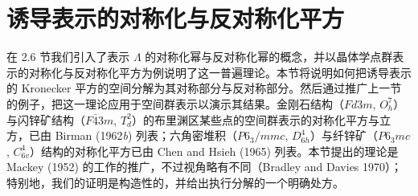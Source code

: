 \section{诱导表示的对称化与反对称化平方}

在 2.6 节我们引入了表示 $\Lambda$ 的对称化幂与反对称化幂的概念，并以晶体学点群表示的对称化与反对称化平方为例说明了这一普遍理论。本节将说明如何把诱导表示的 Kronecker 平方的空间分解为其对称部分与反对称部分。然后通过推广上一节的例子，把这一理论应用于空间群表示以演示其结果。金刚石结构（$Fd3m$, $O^{7}_{h}$）与闪锌矿结构（$F\bar{4}3m$, $T^{2}_{d}$）的布里渊区某些点的空间群表示的对称化平方与立方，已由 Birman (1962\textit{b}) 列表；六角密堆积（$P6_{3}/mmc$, $D^{4}_{6h}$）与纤锌矿（$P6_{3}mc$, $C^{4}_{6v}$）结构的对称化平方已由 Chen and Hsieh (1965) 列表。本节提出的理论是 Mackey (1952) 的工作的推广，不过视角略有不同（Bradley and Davies 1970）；特别地，我们的证明是构造性的，并给出执行分解的一个明确处方。

